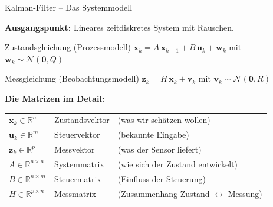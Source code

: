 \documentclass[%
  aspectratio=169,
  10pt
]{beamer}
\newcommand{\R}{\mathbb{R}}
\begin{document}
\begin{frame}{Kalman-Filter -- Das Systemmodell}

\textbf{Ausgangspunkt:} Lineares zeitdiskretes System mit Rauschen.

\vspace{2mm}
\begin{block}{Zustandsgleichung (Prozessmodell)}
  $\mathbf{x}_k = A\,\mathbf{x}_{k-1} + B\,\mathbf{u}_k + \mathbf{w}_k$
  \quad mit $\mathbf{w}_k \sim \mathcal{N}(\mathbf{0}, Q)$
\end{block}
\begin{block}{Messgleichung (Beobachtungsmodell)}
  $\mathbf{z}_k = H\,\mathbf{x}_k + \mathbf{v}_k$
  \quad mit $\mathbf{v}_k \sim \mathcal{N}(\mathbf{0}, R)$
\end{block}

\vspace{2mm}
\textbf{Die Matrizen im Detail:}
\begin{tabular}{lll}
  $\mathbf{x}_k \in \R^n$ & Zustandsvektor & (was wir schätzen wollen) \\
  $\mathbf{u}_k \in \R^m$ & Steuervektor & (bekannte Eingabe) \\
  $\mathbf{z}_k \in \R^p$ & Messvektor & (was der Sensor liefert) \\
  $A \in \R^{n \times n}$  & Systemmatrix & (wie sich der Zustand entwickelt) \\
  $B \in \R^{n \times m}$  & Steuermatrix & (Einfluss der Steuerung) \\
  $H \in \R^{p \times n}$  & Messmatrix & (Zusammenhang Zustand $\leftrightarrow$ Messung)
\end{tabular}

\end{frame}
\end{document}
